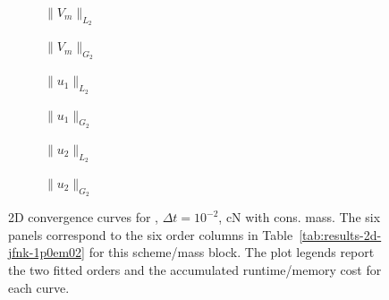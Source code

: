 \begin{figure}[p]
\centering
\begin{subfigure}{0.485\linewidth}
\centering
{}
\caption{$\|V_m\|_{L_2}$}
\label{fig:results-2d-jfnk-1p0em02-cranknicolson-consistent-a}
\end{subfigure}
\hfill
\begin{subfigure}{0.485\linewidth}
\centering
{}
\caption{$\|V_m\|_{G_2}$}
\label{fig:results-2d-jfnk-1p0em02-cranknicolson-consistent-b}
\end{subfigure}
\par\vspace{0.8em}
\begin{subfigure}{0.485\linewidth}
\centering
{}
\caption{$\|u_1\|_{L_2}$}
\label{fig:results-2d-jfnk-1p0em02-cranknicolson-consistent-c}
\end{subfigure}
\hfill
\begin{subfigure}{0.485\linewidth}
\centering
{}
\caption{$\|u_1\|_{G_2}$}
\label{fig:results-2d-jfnk-1p0em02-cranknicolson-consistent-d}
\end{subfigure}
\par\vspace{0.8em}
\begin{subfigure}{0.485\linewidth}
\centering
{}
\caption{$\|u_2\|_{L_2}$}
\label{fig:results-2d-jfnk-1p0em02-cranknicolson-consistent-e}
\end{subfigure}
\hfill
\begin{subfigure}{0.485\linewidth}
\centering
{}
\caption{$\|u_2\|_{G_2}$}
\label{fig:results-2d-jfnk-1p0em02-cranknicolson-consistent-f}
\end{subfigure}
\caption{2D convergence curves for , $\Delta t=10^{-2}$, cN with cons. mass. The six panels correspond to the six order columns in Table~\ref{tab:results-2d-jfnk-1p0em02} for this scheme/mass block. The plot legends report the two fitted orders and the accumulated runtime/memory cost for each curve.}
\label{fig:results-2d-jfnk-1p0em02-cranknicolson-consistent}
\end{figure}
\FloatBarrier


